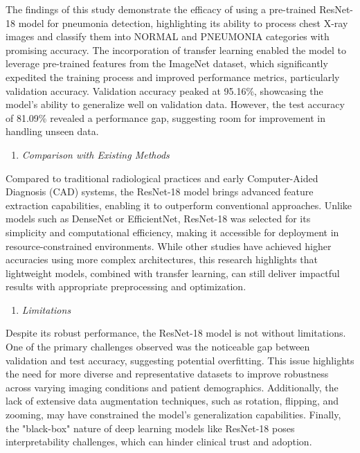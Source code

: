 \documentclass[
  twocolumn,
  10pt,
  a4paper,
  journal
]{IEEEtran}
\begin{document}
The findings of this study demonstrate the efficacy of using a
pre-trained ResNet-18 model for pneumonia detection, highlighting its
ability to process chest X-ray images and classify them into NORMAL and
PNEUMONIA categories with promising accuracy. The incorporation of
transfer learning enabled the model to leverage pre-trained features
from the ImageNet dataset, which significantly expedited the training
process and improved performance metrics, particularly validation
accuracy. Validation accuracy peaked at 95.16\%, showcasing the model's
ability to generalize well on validation data. However, the test
accuracy of 81.09\% revealed a performance gap, suggesting room for
improvement in handling unseen data.

\begin{enumerate}
\def\labelenumi{\Alph{enumi}.}
\setcounter{enumi}{1}
\item
  \emph{Comparison with Existing Methods}
\end{enumerate}

Compared to traditional radiological practices and early Computer-Aided
Diagnosis (CAD) systems, the ResNet-18 model brings advanced feature
extraction capabilities, enabling it to outperform conventional
approaches. Unlike models such as DenseNet or EfficientNet, ResNet-18
was selected for its simplicity and computational efficiency, making it
accessible for deployment in resource-constrained environments. While
other studies have achieved higher accuracies using more complex
architectures, this research highlights that lightweight models,
combined with transfer learning, can still deliver impactful results
with appropriate preprocessing and optimization.

\begin{enumerate}
\def\labelenumi{\Alph{enumi}.}
\setcounter{enumi}{2}
\item
  \emph{Limitations}
\end{enumerate}

Despite its robust performance, the ResNet-18 model is not without
limitations. One of the primary challenges observed was the noticeable
gap between validation and test accuracy, suggesting potential
overfitting. This issue highlights the need for more diverse and
representative datasets to improve robustness across varying imaging
conditions and patient demographics. Additionally, the lack of extensive
data augmentation techniques, such as rotation, flipping, and zooming,
may have constrained the model's generalization capabilities. Finally,
the "black-box" nature of deep learning models like ResNet-18 poses
interpretability challenges, which can hinder clinical trust and
adoption.
\end{document}
